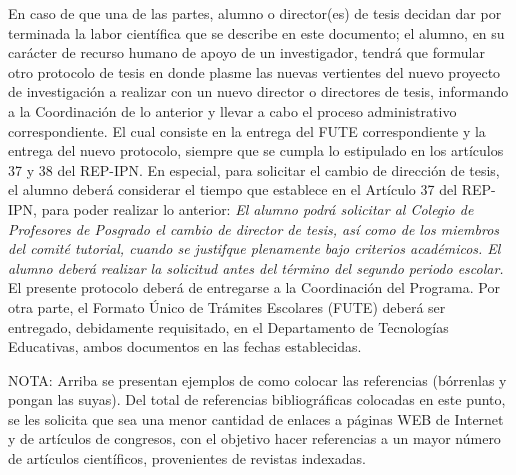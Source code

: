 \documentclass[runningheads,a4paper]{llncs}
\begin{document}
En caso de que una de las partes, alumno o director(es) de tesis decidan dar por
terminada la labor científica que se describe en este documento; el alumno, en
su carácter de recurso humano de apoyo de un investigador, tendrá que formular
otro protocolo de tesis en donde plasme las nuevas vertientes del nuevo proyecto
de investigación a realizar con un nuevo director o directores de tesis,
informando a la Coordinación de lo anterior y llevar a cabo el proceso
administrativo correspondiente. El cual consiste en la entrega del FUTE
correspondiente y la entrega del nuevo protocolo, siempre que se cumpla lo
estipulado en los artículos 37 y 38 del REP-IPN. En especial, para solicitar el
cambio de dirección de tesis, el alumno deberá considerar el tiempo que
establece en el Artículo 37 del REP-IPN, para poder realizar lo anterior:
\newline
\newline
\emph{El alumno podrá solicitar al Colegio de Profesores de Posgrado el cambio de director de tesis, así como de los miembros del comité tutorial, cuando se justifque plenamente bajo criterios académicos. El alumno deberá realizar la solicitud antes del término del segundo periodo escolar.}
\newline
\newline
El presente protocolo deberá de entregarse a la Coordinación del Programa. Por
otra parte, el Formato Único de Trámites Escolares (FUTE) deberá ser entregado,
debidamente requisitado, en el Departamento de Tecnologías Educativas, ambos
documentos en las fechas establecidas.


NOTA: Arriba se presentan ejemplos de como colocar las referencias (bórrenlas y
pongan las suyas). Del total de referencias bibliográficas colocadas en este
punto, se les solicita que sea una menor cantidad de enlaces a páginas WEB de
Internet y de artículos de congresos, con el objetivo hacer referencias a un
mayor número de artículos científicos, provenientes de revistas indexadas. 

\pagebreak
 

\end{document}
